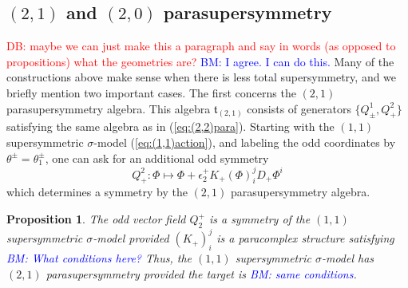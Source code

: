 \documentclass{article}
\newcommand{\RR}{\mathbb{R}}
\newcommand{\p}{\partial}
\newtheorem{proposition}[theorem]{Proposition}
\theoremstyle{definition}
\theoremstyle{remark}
\def\brian{\textcolor{blue}{BM: }\textcolor{blue}}
\def\david{\textcolor{red}{DB: }\textcolor{red}}
\begin{document}


%

\subsection{$(2,1)$ and $(2,0)$ parasupersymmetry}
\david{maybe we can just make this a paragraph and say in words (as opposed to propositions) what the geometries are?}
\brian{I agree. I can do this.}
Many of the constructions above make sense when there is less total supersymmetry, and we briefly mention two important cases. The first concerns the $(2,1)$ parasupersymmetry algebra.
This algebra $\mathfrak{t}_{(2,1)}$ consists of generators $\{Q^1_\pm, Q^2_+\}$ satisfying the same algebra as in (\ref{eq:(2,2)para}). 
Starting with the $(1,1)$ supersymmetric $\sigma$-model (\ref{eq:(1,1)action}), and labeling the odd coordinates by $\theta^\pm = \theta_1^\pm$, one can ask for an additional odd symmetry 
\[
Q^2_+ :  \Phi \mapsto \Phi + \epsilon_2^+ K_+(\Phi)^j_i D_+ \Phi^i
\]
which determines a symmetry by the $(2,1)$ parasupersymmetry algebra.

\begin{proposition}
The odd vector field $Q_2^+$ is a symmetry of the $(1,1)$ supersymmetric $\sigma$-model provided $(K_+)^{j}_i$ is a paracomplex structure satisfying \brian{What conditions here?}
Thus, the $(1,1)$ supersymmetric $\sigma$-model has $(2,1)$ parasupersymmetry provided the target is \brian{same conditions}. 
\end{proposition}
\end{document}

